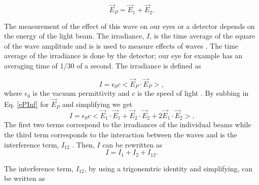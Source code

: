 \documentclass[ notitlepage, numerical, 11pt]{revtex4-1} %
\begin{document}
\begin{equation}
\vec{E}_{P} = \vec{E}_{1} + \vec{E}_{2}.
\label{ePInf}
\end{equation}

The measurement of the effect of this wave on our eyes or a detector depends on the energy of the light beam. The irradiance, $I$, is the time average of the square of the wave amplitude and is is used to measure effects of waves \cite{optics}. The time average of the irradiance is done by the detector; our eye for example has an averaging time of 1/30 of a second. The irradiance is defined as 

\begin{equation}
I = \epsilon_0 c<\vec{E}_{P}\cdot \vec{E}_{P}>,
\label{iInf}
\end{equation}
where $\epsilon_0$ is the vacuum permittivity and $c$ is the speed of light \cite{optics}. By subbing in Eq. \ref{ePInf} for $\vec{E}_{P}$ and simplifying we get 
\begin{equation}
I = \epsilon_0 c<\vec{E}_{1}\cdot \vec{E}_{1}+\vec{E}_{2}\cdot \vec{E}_{2}+2\vec{E}_{1}\cdot \vec{E}_{2}>.
\label{iInf2}
\end{equation}
The first two terms correspond to the irradiances of the individual beams while the third term corresponds to the interaction between the waves and is the interference term, $I_{12}$ \cite{optics}. Then, $I$ can be rewritten as 
\begin{equation}
I = I_1 + I_2 + I_{12}.
\label{iInf3}
\end{equation}

The interference term, $I_{12}$, by using a trigonemtric identity and simplifying, can be written as 
\end{document}
